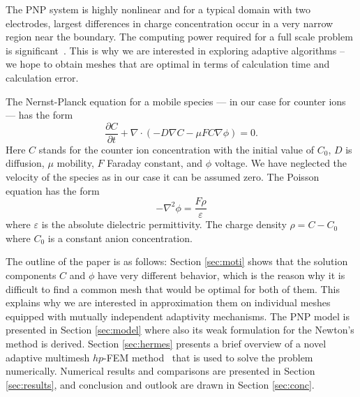 The PNP system is highly nonlinear and for a typical domain with two
electrodes, largest differences in charge concentration occur in a very narrow
region near the boundary. The computing power required for a full scale problem 
is significant~\cite{pugal2010spie3d}. This is why we are interested in exploring adaptive algorithms
-- we hope to obtain meshes that are optimal in terms of calculation time and 
calculation error.

The Nernst-Planck equation for a mobile species ---
in our case for counter ions --- has the form
\begin{equation}
  \frac{\partial C}{\partial t}+\nabla\cdot(-D\nabla C-\mu FC\nabla\phi)=0.
  \label{eq:nernst-planck}
\end{equation}
Here $C$ stands for the counter ion concentration with the initial value of $C_0$,
$D$ is diffusion, $\mu$ mobility,
$F$ Faraday constant, and $\phi$ voltage. We have neglected 
the velocity of the species as in our case it can be assumed zero. 
The Poisson equation has the form
\begin{equation}
  -\nabla^2\phi=\frac{F\rho}{\varepsilon}
  \label{eq:poisson}
\end{equation}
where $\varepsilon$ is the absolute dielectric permittivity. The
charge density $\rho = C-C_{0}$ 
where $C_{0}$ is a constant anion concentration.

The outline of the paper is as follows: Section \ref{sec:moti} shows that 
the solution components $C$ and $\phi$ have very different behavior, which
is the reason why it is difficult to find a common mesh that would be optimal 
for both of them. This explains why we are interested in approximation them
on individual meshes equipped with mutually independent adaptivity 
mechanisms. The PNP model is presented in Section \ref{sec:model} where also its weak 
formulation for the Newton's method is derived. Section \ref{sec:hermes}
presents a brief overview of a novel adaptive multimesh $hp$-FEM 
method~\cite{solin2010monolithic,solin2010adaptive,dubcova2010space,solini2010adaptive}
that is used to solve the 
problem numerically. Numerical results and comparisons are presented in Section 
\ref{sec:results}, and conclusion and outlook are drawn in Section \ref{sec:conc}.


